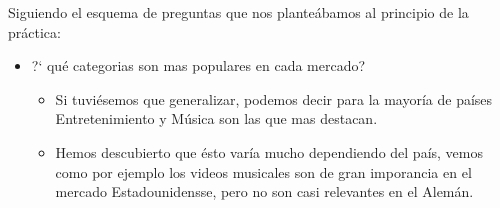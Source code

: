 \documentclass[a4paper,12pt]{article}
\begin{document}
Siguiendo el esquema de preguntas que nos plante\'abamos al principio de la pr\'actica:
\begin{itemize}

\item  ?` qu\'e categorias son mas populares en cada mercado?
\begin{itemize}
\item Si tuvi\'esemos que generalizar, podemos decir para la mayor\'ia de pa\'ises Entretenimiento y M\'usica son las que mas destacan.
\item Hemos descubierto que \'esto var\'ia mucho dependiendo del pa\'is, vemos como por ejemplo los videos musicales son de gran imporancia en el mercado Estadounidensse, pero no son casi relevantes en el Alem\'an. 
\end{itemize}


\end{itemize}
\end{document}
